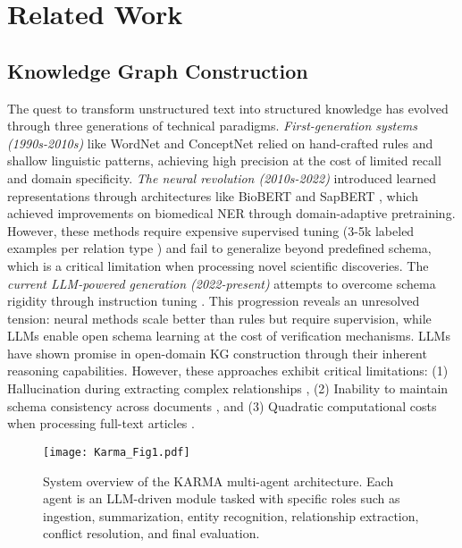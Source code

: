 \section{Related Work}
\subsection{Knowledge Graph Construction}
The quest to transform unstructured text into structured knowledge has evolved through three generations of technical paradigms. \emph{First-generation systems (1990s-2010s)} like WordNet \cite{miller1995wordnet} and ConceptNet \cite{liu2004conceptnet} relied on hand-crafted rules and shallow linguistic patterns, achieving high precision at the cost of limited recall and domain specificity. \emph{The neural revolution (2010s-2022)} introduced learned representations through architectures like BioBERT \cite{lee2020biobert} and SapBERT \cite{liu2021self}, which achieved improvements on biomedical NER through domain-adaptive pretraining. However, these methods require expensive supervised tuning (3-5k labeled examples per relation type \cite{zhang2023biokg}) and fail to generalize beyond predefined schema, which is a critical limitation when processing novel scientific discoveries. The \emph{current LLM-powered generation (2022-present)} attempts to overcome schema rigidity through instruction tuning \cite{pan2024unifying,zhu2024llms}. This progression reveals an unresolved tension: neural methods scale better than rules but require supervision, while LLMs enable open schema learning at the cost of verification mechanisms. LLMs have shown promise in open-domain KG construction through their inherent reasoning capabilities. However, these approaches exhibit critical limitations: (1) Hallucination during extracting complex relationships \cite{manakul2023selfcheckgpt}, (2) Inability to maintain schema consistency across documents \cite{zeng2023consistent}, and (3) Quadratic computational costs when processing full-text articles \cite{ouyang2022training}.

\begin{figure*}[t]
\centering
\texttt{[image: Karma\_Fig1.pdf]}
\caption{System overview of the KARMA multi-agent architecture. Each agent is an LLM-driven module tasked with specific roles such as ingestion, summarization, entity recognition, relationship extraction, conflict resolution, and final evaluation.}
\label{fig:fig2}
\end{figure*}

